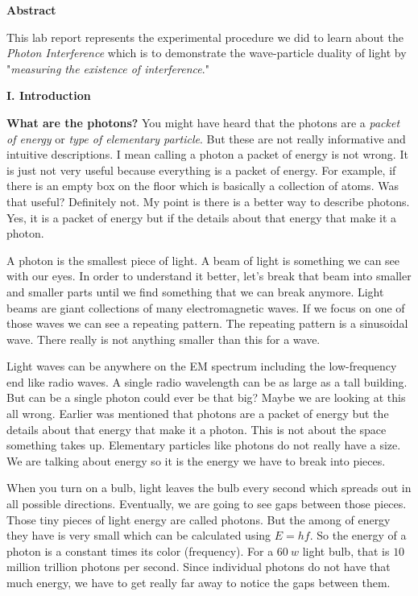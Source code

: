 \documentclass[fleqn]{article}
\begin{document}
  \textbf{Abstract}

  \vspace{10px}

  This lab report represents the experimental procedure we did to learn about the \emph{Photon Interference} which is to demonstrate 
  the wave-particle duality of light by "\emph{measuring the existence of interference}." \textcite{One}

  \vspace{20px}

  \textbf{I. Introduction}

  \vspace{10px}

  \textbf{What are the photons?} You might have heard that the photons are a \emph{packet of energy} or \emph{type of elementary particle}. 
  But these are not really informative and intuitive descriptions. I mean calling a photon a packet of energy is not wrong. It is 
  just not very useful because everything is a packet of energy. For example, if there is an empty box on the floor which is basically 
  a collection of atoms. Was that useful? Definitely not. My point is there is a better way to describe photons. Yes, it is a 
  packet of energy but if the details about that energy that make it a photon. 

  A photon is the smallest piece of light. A beam of light is something we can see with our eyes. In order to understand it better, 
  let’s break that beam into smaller and smaller parts until we find something that we can break anymore. Light beams are giant 
  collections of many electromagnetic waves. If we focus on one of those waves we can see a repeating pattern. The repeating 
  pattern is a sinusoidal wave. There really is not anything smaller than this for a wave.

  Light waves can be anywhere on the EM spectrum including the low-frequency end like radio waves. A single radio wavelength can be as 
  large as a tall building. But can be a single photon could ever be that big? Maybe we are looking at this all wrong. Earlier was 
  mentioned that photons are a packet of energy but the details about that energy that make it a photon. This is not about the space 
  something takes up. Elementary particles like photons do not really have a size. We are talking about energy so it is the energy 
  we have to break into pieces.

  When you turn on a bulb, light leaves the bulb every second which spreads out in all possible directions. Eventually, we are going 
  to see gaps between those pieces. Those tiny pieces of light energy are called photons. But the among of energy they have is very 
  small which can be calculated using $E=hf$. So the energy of a photon is a constant times its color (frequency). For a $60 ~ w$ 
  light bulb, that is $10$ million trillion photons per second. Since individual photons do not have that much energy, we have 
  to get really far away to notice the gaps between them. 
\end{document}

